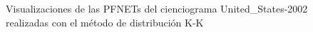 \documentclass[10pt,a4paper,spanish]{article}
\numberwithin{equation}{section} %
\numberwithin{figure}{section} %
\numberwithin{table}{section} %
\begin{document}
\begin{figure}[!h]
{{            \label{q4kkus}
        }
    }
    \caption{Visualizaciones de las PFNETs del cienciograma United\_States-2002 realizadas con el método de distribución K-K}
    \label{kkus}
\end{figure}
\end{document}
